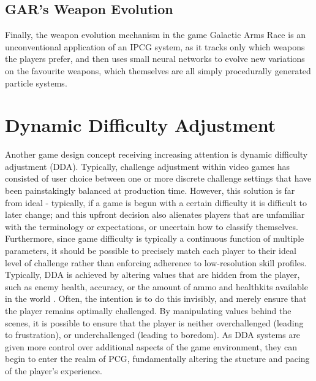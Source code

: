 \documentclass[a4paper,oneside,12pt,openany]{memoir}
\begin{document}
\subsection{GAR's Weapon Evolution}
Finally, the weapon evolution mechanism in the game Galactic Arms Race\cite{garmsr} is an unconventional application of an IPCG system, as it tracks only which weapons the players prefer, and then uses small neural networks to evolve new variations on the favourite weapons, which themselves are all simply procedurally generated particle systems\cite{Hastings:2009:IEP:1650356.1650369}.

\section{Dynamic Difficulty Adjustment}
Another game design concept receiving increasing attention is dynamic difficulty adjustment (DDA). Typically, challenge adjustment within video games has consisted of user choice between one or more discrete challenge settings that have been painstakingly balanced at production time. However, this solution is far from ideal - typically, if a game is begun with a certain difficulty it is difficult to later change; and this upfront decision also alienates players that are unfamiliar with the terminology or expectations, or uncertain how to classify themselves\cite{5765665}. Furthermore, since game difficulty is typically a continuous function of multiple parameters, it should be possible to precisely match each player to their ideal level of challenge rather than enforcing adherence to low-resolution skill profiles. Typically, DDA is achieved by altering values that are hidden from the player, such as enemy health, accuracy, or the amount of ammo and healthkits available in the world \cite{hamlet}. Often, the intention is to do this invisibly, and merely ensure that the player remains optimally challenged. By manipulating values behind the scenes, it is possible to ensure that the player is neither overchallenged (leading to frustration), or underchallenged (leading to boredom)\cite{flow}. As DDA systems are given more control over additional aspects of the game environment, they can begin to enter the realm of PCG, fundamentally altering the stucture and pacing of the player's experience. 
\end{document}
